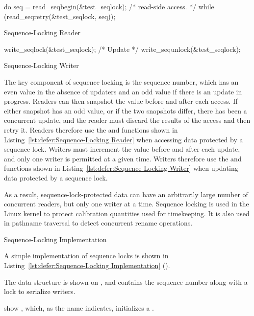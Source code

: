 \begin{listing}
\begin{VerbatimL}
do {
	seq = read_seqbegin(&test_seqlock);
	/* read-side access. */
} while (read_seqretry(&test_seqlock, seq));
\end{VerbatimL}
\caption{Sequence-Locking Reader}
\label{lst:defer:Sequence-Locking Reader}
\end{listing}

\begin{listing}
\begin{VerbatimL}
write_seqlock(&test_seqlock);
/* Update */
write_sequnlock(&test_seqlock);
\end{VerbatimL}
\caption{Sequence-Locking Writer}
\label{lst:defer:Sequence-Locking Writer}
\end{listing}

The key component of sequence locking is the sequence number, which has
an even value in the absence of updaters and an odd value if there
is an update in progress.
Readers can then snapshot the value before and after each access.
If either snapshot has an odd value, or if the two snapshots differ,
there has been a concurrent update, and the reader must discard
the results of the access and then retry it.
Readers therefore use the  and 
functions shown in Listing~\ref{lst:defer:Sequence-Locking Reader}
when accessing data protected by a sequence lock.
Writers must increment the value before and after each update,
and only one writer is permitted at a given time.
Writers therefore use the  and 
functions shown in Listing~\ref{lst:defer:Sequence-Locking Writer}
when updating data protected by a sequence lock.

As a result, sequence-lock-protected data can have an arbitrarily
large number of concurrent readers, but only one writer at a time.
Sequence locking is used in the Linux kernel to protect calibration
quantities used for timekeeping.
It is also used in pathname traversal to detect concurrent rename operations.

\begin{listing}

\caption{Sequence-Locking Implementation}
\label{lst:defer:Sequence-Locking Implementation}
\end{listing}

A simple implementation of sequence locks is shown in
Listing~\ref{lst:defer:Sequence-Locking Implementation}
().
\begin{fcvref}
The  data structure is shown on
, and contains
the sequence number along with a lock to serialize writers.
\end{fcvref}
\begin{fcvref}
 show , which, as the name indicates,
initializes a .
\end{fcvref}

